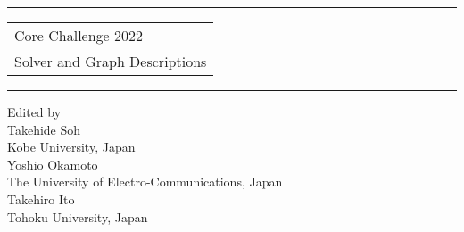 \documentclass[dvipdfmx]{article}
\begin{document}
\pagestyle{plain}
\thispagestyle{empty}
\noindent

\rule{\textwidth}{1pt}
\vspace{2pt}
\begin{flushright}
 \Huge
\begin{tabular}{@{}l}
Core Challenge 2022\\
Solver and Graph Descriptions\\[6pt]
\end{tabular}
\end{flushright}
\vspace{2pt}
\rule{\textwidth}{1pt}
\vspace{10em}


\centering
{\Large Edited by}\\[2em]

{\huge Takehide Soh}\\[0.5em]
{\Large Kobe University, Japan}\\[2em]
{\huge Yoshio Okamoto}\\[0.5em]
{\Large The University of Electro-Communications, Japan}\\[2em]
{\huge Takehiro Ito}\\[0.5em]
{\Large Tohoku University, Japan}\\


\newpage
\begin{flushleft}
    \tableofcontents
\end{flushleft}


\newpage


\newpage


\newpage


\newpage

\end{document}
